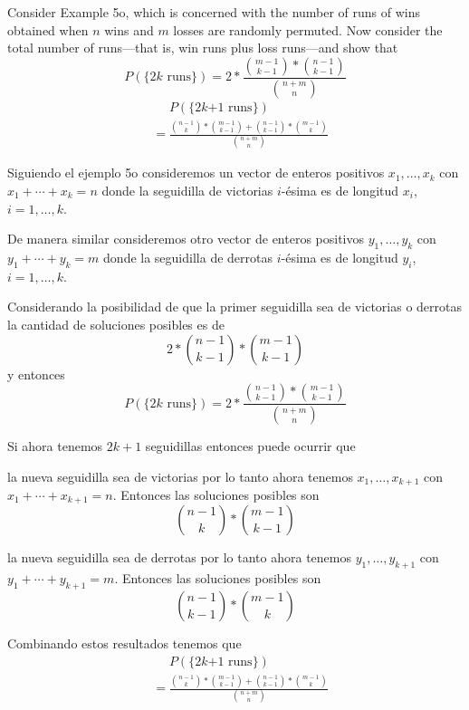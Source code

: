 \item Consider Example 5o, which is concerned with the number of runs of wins obtained when $n$ wins and $m$ losses are randomly permuted. Now consider the total number of runs—that is, win runs plus loss runs—and show that
\[ P(\{\text{2$k$ runs}\}) = 2 * \frac{\binom{m-1}{k-1} * \binom{n-1}{k-1}}{\binom{n+m}{n}} \]
\begin{align*}
    &\phantom{{}={}} P(\{\text{2$k$+1 runs}\}) 
    \\
    &= \frac{\binom{n-1}{k} * \binom{m-1}{k-1} + \binom{n-1}{k-1} * \binom{m-1}{k}}{\binom{n+m}{n}}
\end{align*}

Siguiendo el ejemplo 5o consideremos un vector de enteros positivos $x_1, \dots, x_k$ con $x_1 + \cdots + x_k = n$ donde la seguidilla de victorias $i$-ésima es de longitud $x_i$, $i = 1, \dots, k$.

De manera similar consideremos otro vector de enteros positivos $y_1, \dots, y_k$ con $y_1 + \cdots + y_k = m$ donde la seguidilla de derrotas $i$-ésima es de longitud $y_i$, $i = 1, \dots, k$.

Considerando la posibilidad de que la primer seguidilla sea de victorias o derrotas la cantidad de soluciones posibles es de 
\[ 2 * \binom{n - 1 }{k - 1} * \binom{m - 1 }{k - 1} \]
y entonces
\[ P(\{\text{2$k$ runs}\}) = 2 * \frac{\binom{n - 1 }{k - 1} * \binom{m - 1 }{k - 1}}{\binom{n+m}{n}} \]

Si ahora tenemos $2k+1$ seguidillas entonces puede ocurrir que

la nueva seguidilla sea de victorias por lo tanto ahora tenemos $x_1, \dots, x_{k+1}$ con $x_1 + \cdots + x_{k+1} = n$. Entonces las soluciones posibles son
\[ \binom{n - 1 }{k} * \binom{m - 1 }{k - 1} \]

la nueva seguidilla sea de derrotas por lo tanto ahora tenemos $y_1, \dots, y_{k+1}$ con $y_1 + \cdots + y_{k+1} = m$. Entonces las soluciones posibles son
\[ \binom{n - 1 }{k - 1} * \binom{m - 1 }{k} \]

Combinando estos resultados tenemos que
\begin{align*}
    &\phantom{{}={}} P(\{\text{2$k$+1 runs}\}) 
    \\
    &= \frac{\binom{n-1}{k} * \binom{m-1}{k-1} + \binom{n-1}{k-1} * \binom{m-1}{k}}{\binom{n+m}{n}}
\end{align*}